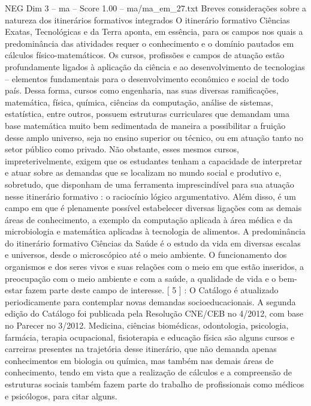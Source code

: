\begin{textsample}{NEG Dim 3 – ma – Score 1.00 – ma/ma\_em\_27.txt}  \label{ex:f3_neg_147}
Breves considerações sobre a natureza dos itinerários formativos integrados O itinerário formativo Ciências Exatas, Tecnológicas e da Terra aponta, em essência, para os campos nos quais a predominância das atividades requer o conhecimento e o domínio pautados em cálculos físico-matemáticos.
Os cursos, profissões e campos de atuação estão profundamente ligados à aplicação da ciência e ao desenvolvimento de tecnologias – elementos fundamentais para o desenvolvimento econômico e social de todo país.
Dessa forma, cursos como engenharia, nas suas diversas ramificações, matemática, física, química, ciências da computação, análise de sistemas, estatística, entre outros, possuem estruturas curriculares que demandam uma base matemática muito bem sedimentada de maneira a possibilitar a fruição desse amplo universo, seja no ensino superior ou técnico, ou em atuação tanto no setor público como privado.
Não obstante, esses mesmos cursos, impreterivelmente, exigem que os estudantes tenham a capacidade de interpretar e atuar sobre as demandas que se localizam no mundo social e produtivo e, sobretudo, que disponham de uma ferramenta imprescindível para sua atuação nesse itinerário formativo : o raciocínio lógico argumentativo.
Além disso, é um campo em que é plenamente possível estabelecer diversas ligações com as demais áreas de conhecimento, a exemplo da computação aplicada à área médica e da microbiologia e matemática aplicadas à tecnologia de alimentos.
A predominância do itinerário formativo Ciências da Saúde é o estudo da vida em diversas escalas e universos, desde o microscópico até o meio ambiente.
O funcionamento dos organismos e dos seres vivos e suas relações com o meio em que estão inseridos, a preocupação com o meio ambiente e com a saúde, a qualidade de vida e o bem-estar fazem parte deste campo de interesse. [ 5 ] : O Catálogo é atualizado periodicamente para contemplar novas demandas socioeducacionais.
A segunda edição do Catálogo foi publicada pela Resolução CNE/CEB no 4/2012, com base no Parecer no 3/2012.
Medicina, ciências biomédicas, odontologia, psicologia, farmácia, terapia ocupacional, fisioterapia e educação física são alguns cursos e carreiras presentes na trajetória desse itinerário, que não demanda apenas conhecimentos em biologia ou química, mas também nas demais áreas de conhecimento, tendo em vista que a realização de cálculos e a compreensão de estruturas sociais também fazem parte do trabalho de profissionais como médicos e psicólogos, para citar alguns.

\end{textsample}
